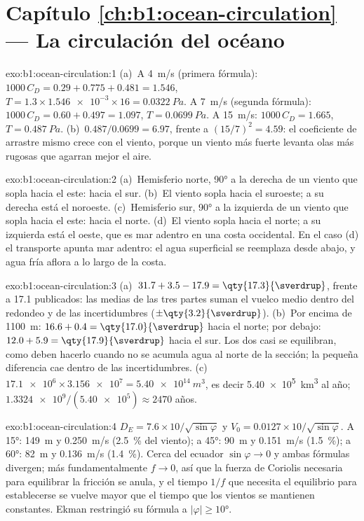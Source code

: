 \section*{Capítulo \ref{ch:b1:ocean-circulation} --- La circulación del océano}

\begin{solution}{exo:b1:ocean-circulation:1}
(a)~A \qty{4}{m/s} (primera fórmula): $1000\,C_D = 0.29 + 0.775 + 0.481 = 1.546$,
$T = 1.3 \times \num{1.546e-3} \times 16 = \qty{0.0322}{Pa}$. A \qty{7}{m/s}
(segunda fórmula): $1000\,C_D = 0.60 + 0.497 = 1.097$, $T = \qty{0.0699}{Pa}$. A
\qty{15}{m/s}: $1000\,C_D = 1.665$, $T = \qty{0.487}{Pa}$. (b)~$0.487/0.0699 =
6.97$, frente a $(15/7)^2 = 4.59$: el coeficiente de arrastre mismo crece con el viento, porque un viento más fuerte levanta olas más rugosas que agarran mejor el aire.
\end{solution}

\begin{solution}{exo:b1:ocean-circulation:2}
(a)~Hemisferio norte, \ang{90} a la derecha de un viento que sopla hacia el este: hacia el sur. (b)~El viento sopla hacia el suroeste; a su derecha está el noroeste. (c)~Hemisferio sur, \ang{90} a la izquierda de un viento que sopla hacia el este: hacia el norte. (d)~El viento sopla hacia el norte; a su izquierda está el oeste, que es mar adentro en una costa occidental. En el caso (d) el transporte apunta mar adentro: el agua superficial se reemplaza desde abajo, y agua fría aflora a lo largo de la costa.
\end{solution}

\begin{solution}{exo:b1:ocean-circulation:3}
(a)~$31.7 + 3.5 - 17.9 = \qty{17.3}{\sverdrup}$, frente a
\qty{17.1}{\sverdrup} publicados: las medias de las tres partes suman el vuelco medio dentro del redondeo y de las incertidumbres ($\pm\qty{3.2}{\sverdrup}$).
(b)~Por encima de \qty{1100}{m}: $16.6 + 0.4 = \qty{17.0}{\sverdrup}$ hacia el norte; por debajo: $12.0 + 5.9 = \qty{17.9}{\sverdrup}$ hacia el sur. Los dos casi se equilibran, como deben hacerlo cuando no se acumula agua al norte de la sección; la pequeña diferencia cae dentro de las incertidumbres. (c)~$\num{17.1e6} \times \num{3.156e7} = \qty{5.40e14}{m^3}$, es decir
\qty{5.40e5}{km^3} al año; $\num{1.3324e9}/(\num{5.40e5}) \approx 2470$ años.
\end{solution}

\begin{solution}{exo:b1:ocean-circulation:4}
$D_E = 7.6 \times 10/\sqrt{\sin\varphi}$ y $V_0 = 0.0127 \times
10/\sqrt{\sin\varphi}$. A \ang{15}: \qty{149}{m} y \qty{0.250}{m/s} (\qty{2.5}{\percent} del viento); a \ang{45}: \qty{90}{m} y \qty{0.151}{m/s} (\qty{1.5}{\percent}); a \ang{60}: \qty{82}{m} y \qty{0.136}{m/s} (\qty{1.4}{\percent}). Cerca del ecuador $\sin\varphi \to 0$ y ambas fórmulas divergen; más fundamentalmente $f \to 0$, así que la fuerza de Coriolis necesaria para equilibrar la fricción se anula, y el tiempo $1/f$ que necesita el equilibrio para establecerse se vuelve mayor que el tiempo que los vientos se mantienen constantes. Ekman restringió su fórmula a $|\varphi| \geq
\ang{10}$.
\end{solution}

